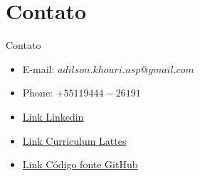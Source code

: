 \section{Contato}

\begin{frame}	
	\begin{block}{Contato}	
		\begin{itemize}
			\item E-mail:  $adilson.khouri.usp@gmail.com$
			\item Phone: $+55 11 9444-26191$
			\item \href{https://www.linkedin.com/in/adilson-khouri-51893918/}{Link Linkedin}
			\item \href{http://lattes.cnpq.br/2654721135214993}{Link Curriculum Lattes}
			\item \href{https://github.com/khouri/Apresentacao_Cusco}{Link Código fonte GitHub}
		\end{itemize}
	\end{block}
\end{frame}

